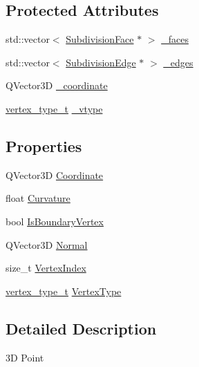 \subsection*{Protected Attributes}
\begin{DoxyCompactItemize}
\item 
std\-::vector$<$ \hyperlink{classShipCAD_1_1SubdivisionFace}{Subdivision\-Face} $\ast$ $>$ \hyperlink{classShipCAD_1_1SubdivisionPoint_ace13688b5e2ad09c8d3f37cc0eaaaa52}{\-\_\-faces}
\item 
std\-::vector$<$ \hyperlink{classShipCAD_1_1SubdivisionEdge}{Subdivision\-Edge} $\ast$ $>$ \hyperlink{classShipCAD_1_1SubdivisionPoint_a17c5a46dc6c130259e96f49719ef3ee9}{\-\_\-edges}
\item 
Q\-Vector3\-D \hyperlink{classShipCAD_1_1SubdivisionPoint_a42bb8f729c7d79e594bda17f92ddb26b}{\-\_\-coordinate}
\item 
\hyperlink{namespaceShipCAD_a03171cc921c53a568b778f5131a60deb}{vertex\-\_\-type\-\_\-t} \hyperlink{classShipCAD_1_1SubdivisionPoint_a37f4626c2c18a4838f693464d93ad291}{\-\_\-vtype}
\end{DoxyCompactItemize}
\subsection*{Properties}
\begin{DoxyCompactItemize}
\item 
Q\-Vector3\-D \hyperlink{classShipCAD_1_1SubdivisionPoint_a5d39b6f7fe221b5848835a0957702c84}{Coordinate}
\item 
float \hyperlink{classShipCAD_1_1SubdivisionPoint_a30f533619dcb24eb00188772c99564b4}{Curvature}
\item 
bool \hyperlink{classShipCAD_1_1SubdivisionPoint_ad78eae7c6c9a35c329f1137817e10a8d}{Is\-Boundary\-Vertex}
\item 
Q\-Vector3\-D \hyperlink{classShipCAD_1_1SubdivisionPoint_aeaf744ea3deb2bdc55e9e90d3e8b58a2}{Normal}
\item 
size\-\_\-t \hyperlink{classShipCAD_1_1SubdivisionPoint_ad4ec233273e3bc788d2dd6736530d645}{Vertex\-Index}
\item 
\hyperlink{namespaceShipCAD_a03171cc921c53a568b778f5131a60deb}{vertex\-\_\-type\-\_\-t} \hyperlink{classShipCAD_1_1SubdivisionPoint_ab926cef40515c3a4c94a902fb50aa35a}{Vertex\-Type}
\end{DoxyCompactItemize}


\subsection{Detailed Description}
3\-D Point 

